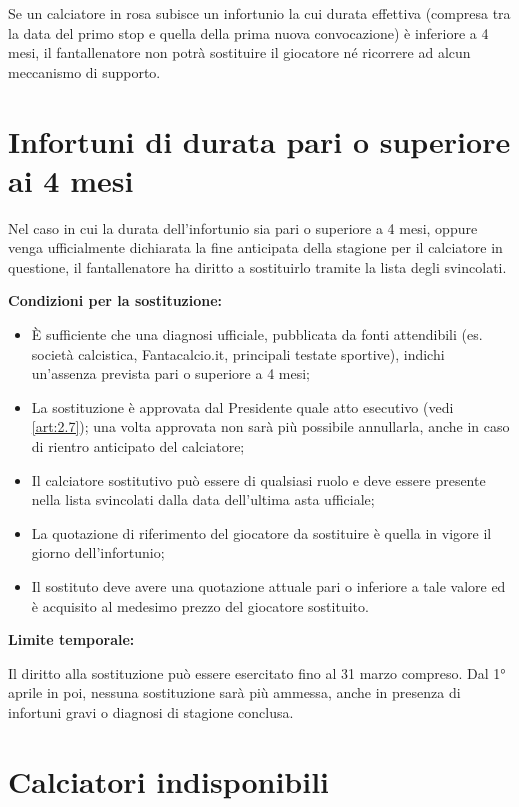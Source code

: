 Se un calciatore in rosa subisce un infortunio la cui durata effettiva (compresa tra la data del primo stop e quella della prima nuova convocazione) è inferiore a 4 mesi, il fantallenatore non potrà sostituire il giocatore né ricorrere ad alcun meccanismo di supporto.

\section{Infortuni di durata pari o superiore ai 4 mesi}
\label{art:7.3}

Nel caso in cui la durata dell'infortunio sia pari o superiore a 4 mesi, oppure venga ufficialmente dichiarata la fine anticipata della stagione per il calciatore in questione, il fantallenatore ha diritto a sostituirlo tramite la lista degli svincolati.

\textbf{Condizioni per la sostituzione:}
\begin{itemize}
\item È sufficiente che una diagnosi ufficiale, pubblicata da fonti attendibili (es. società calcistica, Fantacalcio.it, principali testate sportive), indichi un'assenza prevista pari o superiore a 4 mesi;
\item La sostituzione è approvata dal Presidente quale atto esecutivo (vedi \ref{art:2.7}); una volta approvata non sarà più possibile annullarla, anche in caso di rientro anticipato del calciatore;
\item Il calciatore sostitutivo può essere di qualsiasi ruolo e deve essere presente nella lista svincolati dalla data dell'ultima asta ufficiale;
\item La quotazione di riferimento del giocatore da sostituire è quella in vigore il giorno dell'infortunio;
\item Il sostituto deve avere una quotazione attuale pari o inferiore a tale valore ed è acquisito al medesimo prezzo del giocatore sostituito.
\end{itemize}

 \textbf{Limite temporale:}

Il diritto alla sostituzione può essere esercitato fino al 31 marzo compreso. Dal 1° aprile in poi, nessuna sostituzione sarà più ammessa, anche in presenza di infortuni gravi o diagnosi di stagione conclusa.

\section{Calciatori indisponibili}
\label{art:7.4}

